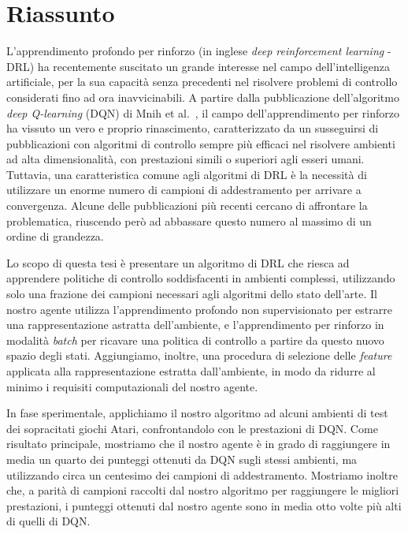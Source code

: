 \newpage
\chapter*{Riassunto}


L'apprendimento profondo per rinforzo (in inglese \textit{deep reinforcement 
learning} - DRL) ha recentemente suscitato un grande interesse nel campo 
dell'intelligenza artificiale, per la sua capacit\`a senza precedenti nel 
risolvere problemi di controllo considerati fino ad ora inavvicinabili.
A partire dalla pubblicazione dell'algoritmo \textit{deep Q-learning} (DQN) di 
Mnih et al.\ \cite{mnih2015human}, il campo dell'apprendimento per rinforzo ha 
vissuto un vero e proprio rinascimento, caratterizzato da un susseguirsi di 
pubblicazioni con algoritmi di controllo sempre pi\`u efficaci nel risolvere 
ambienti ad alta dimensionalit\`a, con prestazioni simili o superiori agli esseri 
umani. 
Tuttavia, una caratteristica comune agli algoritmi di DRL \`e la 
necessit\`a di utilizzare un enorme numero di campioni di addestramento per
arrivare a convergenza. Alcune delle pubblicazioni pi\`u recenti cercano di 
affrontare la problematica, riuscendo per\`o ad abbassare questo numero al 
massimo di un ordine di grandezza.

Lo scopo di questa tesi \`e presentare un algoritmo di DRL che riesca ad 
apprendere politiche di controllo soddisfacenti in ambienti complessi, 
utilizzando solo una frazione dei campioni necessari agli algoritmi dello stato 
dell'arte. 
Il nostro agente utilizza l'apprendimento profondo non supervisionato per 
estrarre una rappresentazione astratta dell'ambiente, e l'apprendimento per 
rinforzo in modalit\`a \textit{batch} per ricavare una politica di controllo 
a partire da questo nuovo spazio degli stati. 
Aggiungiamo, inoltre, una procedura di selezione delle \textit{feature} 
applicata alla rappresentazione estratta dall'ambiente, in modo da ridurre al 
minimo i requisiti computazionali del nostro agente. 

In fase sperimentale, applichiamo il nostro algoritmo ad alcuni ambienti di test 
dei sopracitati giochi Atari, confrontandolo con le prestazioni di DQN. 
Come risultato principale, mostriamo che il nostro agente \`e in grado di 
raggiungere in media un quarto dei punteggi ottenuti da DQN sugli stessi 
ambienti, ma utilizzando circa un centesimo dei campioni di addestramento.
Mostriamo inoltre che, a parit\`a di campioni raccolti dal nostro algoritmo per
raggiungere le migliori prestazioni, i punteggi ottenuti dal nostro agente sono 
in media otto volte pi\`u alti di quelli di DQN. 

